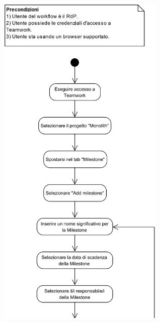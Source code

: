 \begin{samepage}
	\mbox{}\\	
	\begin{center}
		\includegraphics[width=8cm]{../../documenti/NormeDiProgetto/DiagrammiProcedure/CreazioneMilestone1.png}
	\end{center}
\end{samepage}

